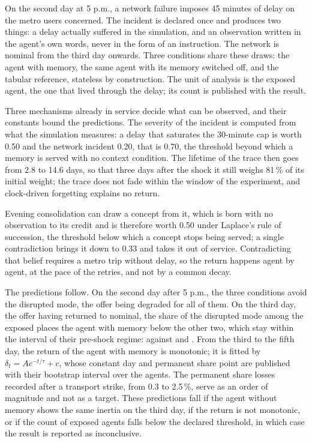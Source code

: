 On the second day at 5 p.m., a network failure imposes 45 minutes of delay on the metro users concerned. The incident is declared once and produces two things: a delay actually suffered in the simulation, and an observation written in the agent's own words, never in the form of an instruction. The network is nominal from the third day onwards. Three conditions share these draws: the agent with memory, the same agent with its memory switched off, and the tabular reference, stateless by construction. The unit of analysis is the exposed agent, the one that lived through the delay; its count is published with the result.

Three mechanisms already in service decide what can be observed, and their constants bound the predictions. The severity of the incident is computed from what the simulation measures: a delay that saturates the 30-minute cap is worth 0.50 and the network incident 0.20, that is 0.70, the threshold beyond which a memory is served with no context condition. The lifetime of the trace then goes from 2.8 to 14.6 days, so that three days after the shock it still weighs 81\,\% of its initial weight; the trace does not fade within the window of the experiment, and clock-driven forgetting explains no return.

Evening consolidation can draw a concept from it, which is born with no observation to its credit and is therefore worth 0.50 under Laplace's rule of succession, the threshold below which a concept stops being served; a single contradiction brings it down to 0.33 and takes it out of service. Contradicting that belief requires a metro trip without delay, so the return happens agent by agent, at the pace of the retries, and not by a common decay.

The predictions follow. On the second day after 5 p.m., the three conditions avoid the disrupted mode, the offer being degraded for all of them. On the third day, the offer having returned to nominal, the share of the disrupted mode among the exposed places the agent with memory below the other two, which stay within the interval of their pre-shock regime:  against  and . From the third to the fifth day, the return of the agent with memory is monotonic; it is fitted by $\delta_t = A e^{-t/\tau} + c$, whose constant  day and permanent share  point are published with their bootstrap interval over the agents. The permanent share losses recorded after a transport strike, from 0.3 to 2.5\,\%, serve as an order of magnitude and not as a target. These predictions fall if the agent without memory shows the same inertia on the third day, if the return is not monotonic, or if the count of exposed agents falls below the declared threshold, in which case the result is reported as inconclusive.

